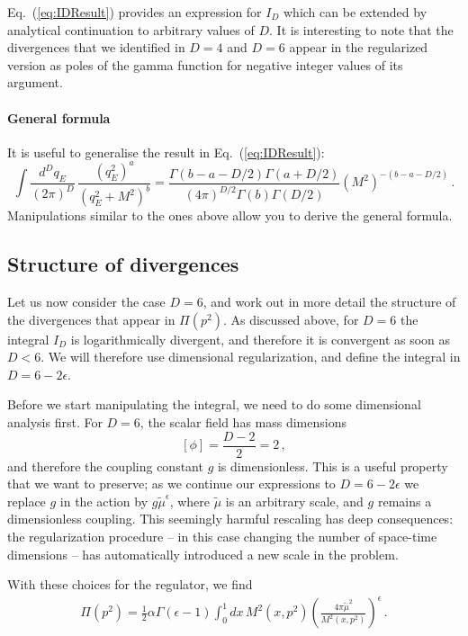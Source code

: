 Eq.~(\ref{eq:IDResult}) provides an expression for $I_D$ which can be
extended by analytical continuation to arbitrary values of $D$. It is
interesting to note that the divergences that we identified in $D=4$
and $D=6$ appear in the regularized version as poles of the gamma
function for negative integer values of its argument. 

\paragraph{General formula}

It is useful to generalise the result in Eq.~(\ref{eq:IDResult}):
\begin{equation}
  \boxed{
  \int \frac{d^Dq_E}{(2\pi)^D}\,
  \frac{\left(q_E^2\right)^a}{\left(q_E^2+M^2\right)^b}
  = \frac{\Gamma(b-a-D/2) \Gamma(a+D/2)}{(4\pi)^{D/2} \Gamma(b)
  \Gamma(D/2)} \left(M^2\right)^{-(b-a-D/2)}\, .}
\end{equation}
Manipulations similar to the ones above allow you to derive the
general formula. 

\subsection{Structure of divergences}
\label{sec:struct-diverg}

Let us now consider the case $D=6$, and work out in more detail the
structure of the divergences that appear in $\Pi(p^2)$. As discussed
above, for $D=6$ the integral $I_D$ is logarithmically divergent, and
therefore it is convergent as soon as $D<6$. We will therefore use
dimensional regularization, and define the integral in
$D=6-2\epsilon$.

Before we start manipulating the integral, we need to do some
dimensional analysis first. For $D=6$, the scalar field has mass
dimensions
\[
  \left[\phi\right] = \frac{D-2}{2}= 2\, ,
\]
and therefore the coupling constant $g$ is dimensionless. This is a
useful property that we want to preserve; as we continue our
expressions to $D=6-2\epsilon$ we replace $g$ in the action by
$g\tilde{\mu}^\epsilon$, where $\tilde{\mu}$ is an arbitrary scale,
and $g$ remains a dimensionless coupling. This seemingly harmful
rescaling has deep consequences: the regularization procedure -- in
this case changing the number of space-time dimensions -- has
automatically introduced a new scale in the problem.

With these choices for the regulator, we find
\begin{align}
  \Pi(p^2) = \frac12 \alpha \Gamma(\epsilon-1) \int_0^1dx\,
  M^2(x,p^2)
  \left(\frac{4\pi\tilde{\mu}^2}{M^2(x,p^2)}\right)^\epsilon\, .
\end{align}

